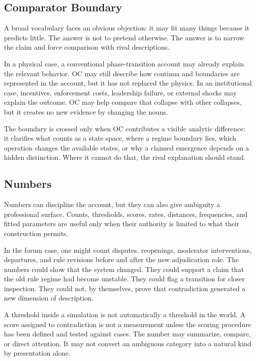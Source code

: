 \documentclass[11pt,a4paper,openany]{book}
\begin{document}
\subsection{Comparator Boundary}
A broad vocabulary faces an obvious objection: it may fit many things because it predicts little. The answer is not to pretend otherwise. The answer is to narrow the claim and force comparison with rival descriptions. \cite{wilson_renormalization,landau_stat_physics}\par
In a physical case, a conventional phase-transition account may already explain the relevant behavior. OC may still describe how continua and boundaries are represented in the account, but it has not replaced the physics. In an institutional case, incentives, enforcement costs, leadership failure, or external shocks may explain the outcome. OC may help compare that collapse with other collapses, but it creates no new evidence by changing the nouns.\par
The boundary is crossed only when OC contributes a visible analytic difference: it clarifies what counts as a state space, where a regime boundary lies, which operation changes the available states, or why a claimed emergence depends on a hidden distinction. Where it cannot do that, the rival explanation should stand.\par
\subsection{Numbers}
Numbers can discipline the account, but they can also give ambiguity a professional surface. Counts, thresholds, scores, rates, distances, frequencies, and fitted parameters are useful only when their authority is limited to what their construction permits. \cite{wilson_renormalization,landau_stat_physics}\par
In the forum case, one might count disputes, reopenings, moderator interventions, departures, and rule revisions before and after the new adjudication role. The numbers could show that the system changed. They could support a claim that the old rule regime had become unstable. They could flag a transition for closer inspection. They could not, by themselves, prove that contradiction generated a new dimension of description.\par
A threshold inside a simulation is not automatically a threshold in the world. A score assigned to contradiction is not a measurement unless the scoring procedure has been defined and tested against cases. The number may summarize, compare, or direct attention. It may not convert an ambiguous category into a natural kind by presentation alone.\par
\end{document}
